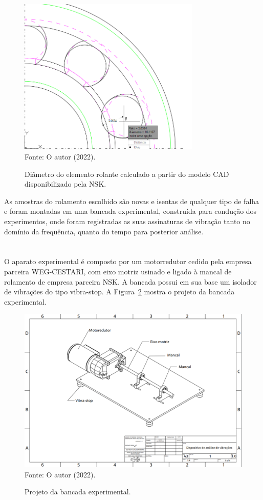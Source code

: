 \documentclass[
	12pt,				
	oneside,			
	a4paper,			
	english,			
	brazil,	
	sumario=abnt-6027-2012		
	]{abntex2ppgsi}
\begin{document}
\begin{figure}[H]
\centering
\caption {Diâmetro do elemento rolante calculado a partir do modelo CAD disponibilizado pela NSK.}
\includegraphics[width=\textwidth,height=75mm,keepaspectratio]{diametro_rolamento} \\
Fonte: O autor (2022).
\label{diametro_rolamento}
\end{figure} 

As amostras do rolamento escolhido são novas e isentas de qualquer tipo de falha e foram montadas em uma bancada experimental, construída para condução dos experimentos, onde foram registradas as suas assinaturas de vibração tanto no domínio da frequência, quanto do tempo para posterior análise. 

\section{}

O aparato experimental é composto por um motorredutor cedido pela empresa parceira WEG-CESTARI, com eixo motriz usinado e ligado à mancal de rolamento de empresa parceira NSK. A bancada possui em sua base um isolador de vibrações do tipo vibra-stop. A Figura~\ref{Figura22} mostra o projeto da bancada experimental. 

\begin{figure}[H]
\centering
\caption {Projeto da bancada experimental.}
\includegraphics[width=\textwidth,height=\textheight,keepaspectratio]{Figura22} \\
Fonte: O autor (2022).
\label{Figura22}
\end{figure}
\end{document}
